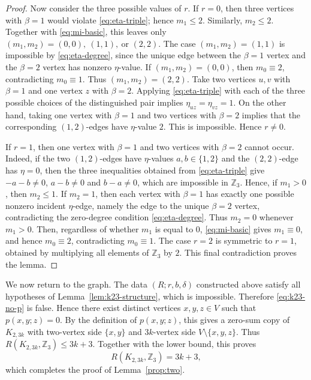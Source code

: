 ﻿\documentclass[11pt]{article}
\numberwithin{equation}{section}
\theoremstyle{remark}
\newcommand{\Z}{\mathbb Z}
\begin{document}
\begin{proof}
    Now consider the three possible values of \(r\).
    If \(r=0\), then three vertices with \(\beta=1\) would violate \eqref{eq:eta-triple}; hence \(m_1\le 2\). Similarly, \(m_2\le 2\). Together with \eqref{eq:mi-basic}, this leaves only
    \((m_1,m_2)=(0,0),\ (1,1),\ \text{or }(2,2).\)
    The case \((m_1,m_2)=(1,1)\) is impossible by \eqref{eq:eta-degree}, since the unique edge between the \(\beta=1\) vertex and the \(\beta=2\) vertex has nonzero \(\eta\)-value. If \((m_1,m_2)=(0,0)\), then \(m_0\equiv 2\), contradicting $m_0\equiv 1$. Thus \((m_1,m_2)=(2,2)\).
    Take two vertices \(u,v\) with \(\beta=1\) and one vertex \(z\) with \(\beta=2\). Applying \eqref{eq:eta-triple} with each of the three possible choices of the distinguished pair implies
    \(\eta_{uz}=\eta_{vz}=1.\)
    On the other hand, taking one vertex with \(\beta=1\) and two vertices with \(\beta=2\) implies that the corresponding \((1,2)\)-edges have \(\eta\)-value \(2\). This is impossible. Hence \(r\ne 0\).

    If \(r=1\), then one vertex with \(\beta=1\) and two vertices with \(\beta=2\) cannot occur. Indeed, if the two \((1,2)\)-edges have \(\eta\)-values $a,b\in\{1,2\}$ and the \((2,2)\)-edge has \(\eta=0\), then the three inequalities obtained from \eqref{eq:eta-triple} give $-a-b\ne0$, $a-b\ne0$ and $b-a\ne0$, which are impossible in $\Z_3$. Hence, if \(m_1>0\), then \(m_2\le 1\). If \(m_2=1\), then each vertex with \(\beta=1\) has exactly one possible nonzero incident \(\eta\)-edge, namely the edge to the unique \(\beta=2\) vertex, contradicting the zero-degree condition \eqref{eq:eta-degree}. Thus \(m_2=0\) whenever \(m_1>0\). Then, regardless of whether $m_1$ is equal to 0, \eqref{eq:mi-basic} gives \(m_1\equiv 0\), and hence \(m_0\equiv 2\), contradicting \(m_0\equiv 1\).
    The case \(r=2\) is symmetric to \(r=1\), obtained by multiplying all elements of \(\Z_3\) by \(2\).
    This final contradiction proves the lemma.
\end{proof}

We now return to the graph. The data \((R;r,b,\delta)\) constructed above satisfy all hypotheses of Lemma~\ref{lem:k23-structure}, which is impossible. Therefore \eqref{eq:k23-no-p} is false. Hence there exist distinct vertices \(x,y,z\in V\) such that $p(x,y;z)=0$.
By the definition of \(p(x,y;z)\), this gives a zero-sum copy of \(K_{2,3k}\) with two-vertex side \(\{x,y\}\) and \(3k\)-vertex side \(V\setminus\{x,y,z\}\). Thus
\(R(K_{2,3k},\Z_3)\le 3k+3.\)
Together with the lower bound, this proves
\[R(K_{2,3k},\Z_3)=3k+3,\]
which completes the proof of Lemma~\ref{prop:two}.
\end{document}
